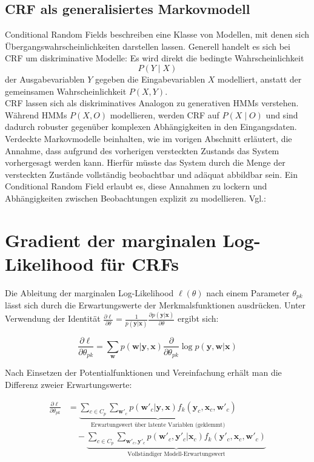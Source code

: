 \subsection{CRF als generalisiertes Markovmodell}

Conditional Random Fields  beschreiben eine Klasse von Modellen, mit denen sich Übergangswahrscheinlichkeiten darstellen lassen.
Generell handelt es sich bei CRF um diskriminative Modelle: Es wird direkt die bedingte Wahrscheinlichkeit
\[
  P(Y \mid X)
\]
der Ausgabevariablen $Y$ gegeben die Eingabevariablen $X$ modelliert, anstatt der gemeinsamen Wahrscheinlichkeit $P(X, Y)$.
\\
CRF lassen sich als diskriminatives Analogon zu generativen HMMs verstehen. Während HMMs $P(X, O)$ modellieren, werden CRF auf $P(X \mid O)$ und sind dadurch robuster gegenüber komplexen Abhängigkeiten in den Eingangsdaten.
Verdeckte Markovmodelle beinhalten, wie im vorigen Abschnitt erläutert, die Annahme, dass aufgrund des vorherigen versteckten Zustands das System vorhergesagt werden kann.
Hierfür müsste das System durch die Menge der versteckten Zustände vollständig beobachtbar und adäquat abbildbar sein.
Ein Conditional Random Field erlaubt es, diese Annahmen zu lockern und Abhängigkeiten zwischen Beobachtungen explizit zu modellieren. Vgl.:\ \cite{10.5555/645530.655813}

\section*{Gradient der marginalen Log-Likelihood für CRFs}

Die Ableitung der marginalen Log-Likelihood $\ell(\theta)$ nach einem Parameter $\theta_{pk}$ lässt sich durch die Erwartungswerte der Merkmalsfunktionen ausdrücken. Unter Verwendung der Identität $\frac{\partial \ell}{\partial \theta} = \frac{1}{p(\mathbf{y}|\mathbf{x})} \frac{\partial p(\mathbf{y}|\mathbf{x})}{\partial \theta}$ ergibt sich:

\begin{equation}
\frac{\partial \ell}{\partial \theta_{pk}} = \sum_{\mathbf{w}} p(\mathbf{w}|\mathbf{y}, \mathbf{x}) \frac{\partial}{\partial \theta_{pk}} \log p(\mathbf{y}, \mathbf{w}|\mathbf{x})
\end{equation}

Nach Einsetzen der Potentialfunktionen und Vereinfachung erhält man die Differenz zweier Erwartungswerte:

\begin{equation}
    \begin{split}
        \frac{\partial \ell}{\partial \theta_{pk}} &= \underbrace{\sum_{c \in C_p} \sum_{\mathbf{w}'_c} p(\mathbf{w}'_c|\mathbf{y}, \mathbf{x}) f_k(\mathbf{y}_c, \mathbf{x}_c, \mathbf{w}'_c)}_{\text{Erwartungswert über latente Variablen (geklemmt)}} \\
        &\quad - \underbrace{\sum_{c \in C_p} \sum_{\mathbf{w}'_c, \mathbf{y}'_c} p(\mathbf{w}'_c, \mathbf{y}'_c|\mathbf{x}_c) f_k(\mathbf{y}'_c, \mathbf{x}_c, \mathbf{w}'_c)}_{\text{Vollständiger Modell-Erwartungswert}}
    \end{split}
\end{equation}

